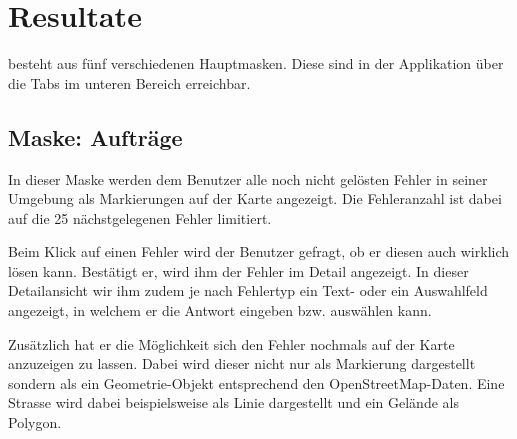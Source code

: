 \section{Resultate}

\kort besteht aus fünf verschiedenen Hauptmasken.
Diese sind in der Applikation über die Tabs im unteren Bereich erreichbar.

\subsection{Maske: Aufträge}
In dieser Maske werden dem Benutzer alle noch nicht gelösten Fehler in seiner Umgebung als Markierungen auf der Karte angezeigt.
Die Fehleranzahl ist dabei auf die 25 nächstgelegenen Fehler limitiert.

Beim Klick auf einen Fehler wird der Benutzer gefragt, ob er diesen auch wirklich lösen kann.
Bestätigt er, wird ihm der Fehler im Detail angezeigt.
In dieser Detailansicht wir ihm zudem je nach Fehlertyp ein Text- oder ein Auswahlfeld angezeigt, in welchem er die Antwort eingeben bzw. auswählen kann. 

Zusätzlich hat er die Möglichkeit sich den Fehler nochmals auf der Karte anzuzeigen zu lassen.
Dabei wird dieser nicht nur als Markierung dargestellt sondern als ein Geometrie-Objekt entsprechend den \gls{OpenStreetMap}-Daten.
Eine Strasse wird dabei beispielsweise als Linie dargestellt und ein Gelände als Polygon.

